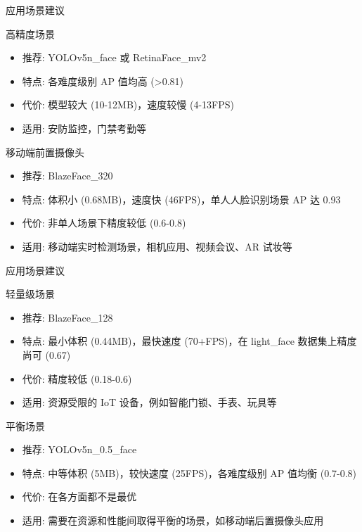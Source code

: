 \documentclass{beamer}
\begin{document}
\begin{frame}{应用场景建议}
    \begin{block}{高精度场景}
        \begin{itemize}
            \footnotesize
            \item 推荐: YOLOv5n\_face 或 RetinaFace\_mv2
            \item 特点: 各难度级别 AP 值均高 (>0.81)
            \item 代价: 模型较大 (10-12MB)，速度较慢 (4-13FPS)
            \item 适用: 安防监控，门禁考勤等
        \end{itemize}
    \end{block}

    \begin{block}{移动端前置摄像头}
        \begin{itemize}
            \footnotesize
            \item 推荐: BlazeFace\_320
            \item 特点: 体积小 (0.68MB)，速度快 (46FPS)，单人人脸识别场景 AP 达 0.93
            \item 代价: 非单人场景下精度较低 (0.6-0.8)
            \item 适用: 移动端实时检测场景，相机应用、视频会议、AR 试妆等
        \end{itemize}
    \end{block}
\end{frame}


\begin{frame}{应用场景建议}
    \begin{block}{轻量级场景}
        \begin{itemize}
            \footnotesize
            \item 推荐: BlazeFace\_128
            \item 特点: 最小体积 (0.44MB)，最快速度 (70+FPS)，在 light\_face 数据集上精度尚可 (0.67)
            \item 代价: 精度较低 (0.18-0.6)
            \item 适用: 资源受限的 IoT 设备，例如智能门锁、手表、玩具等
        \end{itemize}
    \end{block}
    \begin{block}{平衡场景}
        \begin{itemize}
            \footnotesize
            \item 推荐: YOLOv5n\_0.5\_face
            \item 特点: 中等体积 (5MB)，较快速度 (25FPS)，各难度级别 AP 值均衡 (0.7-0.8)
            \item 代价: 在各方面都不是最优
            \item 适用: 需要在资源和性能间取得平衡的场景，如移动端后置摄像头应用
        \end{itemize}
    \end{block}
\end{frame}
\end{document}

